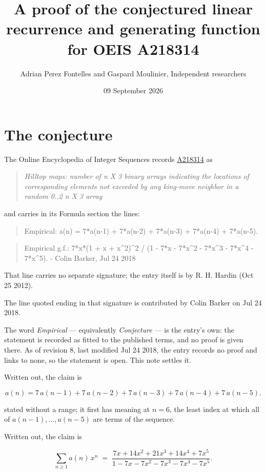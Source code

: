 \documentclass[11pt]{article}
\title{A proof of the conjectured linear recurrence and generating function for OEIS A218314}
\author{Adrian Perez Fontelles and Gaspard Moulinier, Independent researchers}
\date{09 September 2026}
\theoremstyle{definition}
\begin{document}
\maketitle
\section{The conjecture}

The Online Encyclopedia of Integer Sequences records \href{https://oeis.org/A218314}{A218314} as

\begin{quote}\itshape Hilltop maps: number of n X 3 binary arrays indicating the locations of corresponding elements not exceeded by any king-move neighbor in a random 0..2 n X 3 array\end{quote}

and carries in its Formula section the lines:

\begin{quote}\ttfamily Empirical: a(n) = 7*a(n-1) + 7*a(n-2) + 7*a(n-3) + 7*a(n-4) + 7*a(n-5).\end{quote}

\begin{quote}\ttfamily Empirical g.f.: 7*x*(1 + x + x\textasciicircum{}2)\textasciicircum{}2 / (1 - 7*x - 7*x\textasciicircum{}2 - 7*x\textasciicircum{}3 - 7*x\textasciicircum{}4 - 7*x\textasciicircum{}5). - Colin Barker, Jul 24 2018\end{quote}

That line carries no separate signature; the entry itself is by R. H. Hardin (Oct 25 2012).

The line quoted ending in that signature is contributed by Colin Barker on Jul 24 2018.

The word {\itshape Empirical} --- equivalently {\itshape Conjecture} --- is the entry's own: the statement is recorded as fitted to the published terms, and no proof is given there. As of revision 8, last modified Jul 24 2018, the entry records no proof and links to none, so the statement is open. This note settles it.

Written out, the claim is

\[a(n) = 7\,a(n-1) + 7\,a(n-2) + 7\,a(n-3) + 7\,a(n-4) + 7\,a(n-5).\]

stated without a range; it first has meaning at $n = 6$, the least index at which all of $a(n-1),\dots,a(n-5)$ are terms of the sequence.

Written out, the claim is

\[\sum_{n \ge 1} a(n)\,x^n \;=\; \frac{7x + 14x^{2} + 21x^{3} + 14x^{4} + 7x^{5}}{1 - 7x - 7x^{2} - 7x^{3} - 7x^{4} - 7x^{5}}.\]
\end{document}
